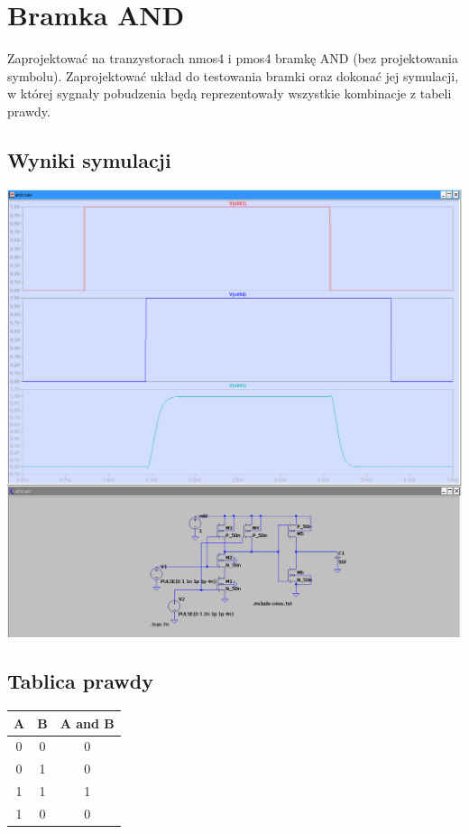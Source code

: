 \documentclass[a4paper, 11pt]{article}
\begin{document}

\section{Bramka AND}\label{sec:and} %
Zaprojektować na tranzystorach nmos4 i pmos4 bramkę AND (bez projektowania symbolu). Zaprojektować
układ do testowania bramki oraz dokonać jej symulacji, w której sygnały pobudzenia będą reprezentowały
wszystkie kombinacje z tabeli prawdy.
\subsection{Wyniki symulacji}\label{sub:wyniki_symulacji} %
\begin{center}
	\includegraphics[scale=0.35]{images/and.png}
\end{center}
\subsection{Tablica prawdy}\label{sub:tablica_prawdy} %
\begin{center}
	\begin{tabular}{c|c|c}
		A & B & A and B \\
		\hline
		0 & 0 & 0       \\
		0 & 1 & 0       \\
		1 & 1 & 1       \\
		1 & 0 & 0       \\
	\end{tabular}
\end{center}
\end{document}
